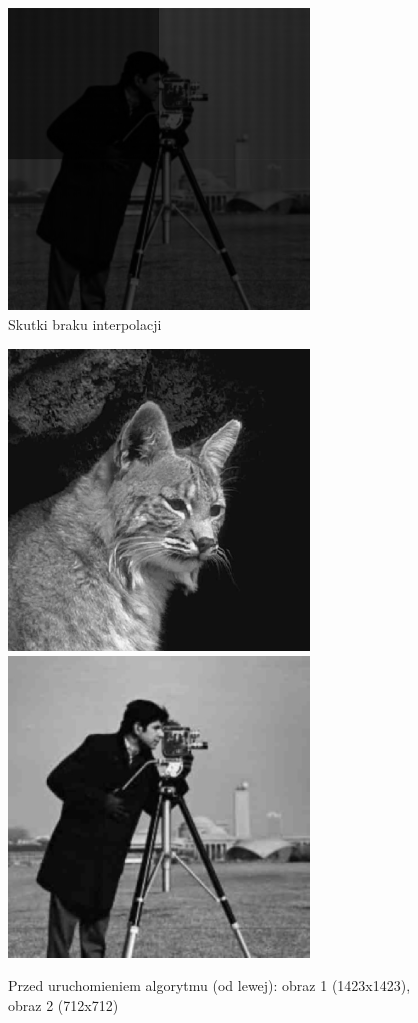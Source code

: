 \documentclass[a4paper,12pt]{book}
\begin{document}
\begin{figure}[H]
	\caption{Skutki braku interpolacji}
	\begin{center}
		\includegraphics[width=8cm, height=8cm]{1-2/man-without-interpolation.png}
	\end{center}
\end{figure}
\begin{figure}[H]
	\caption{Przed uruchomieniem algorytmu (od lewej): obraz 1 (1423x1423), obraz 2 (712x712)}
	\includegraphics[width=8cm, height=8cm]{cat-unmodified.jpg}
	\includegraphics[width=8cm, height=8cm]{man-unmodified.jpg}
\end{figure}
\end{document}
